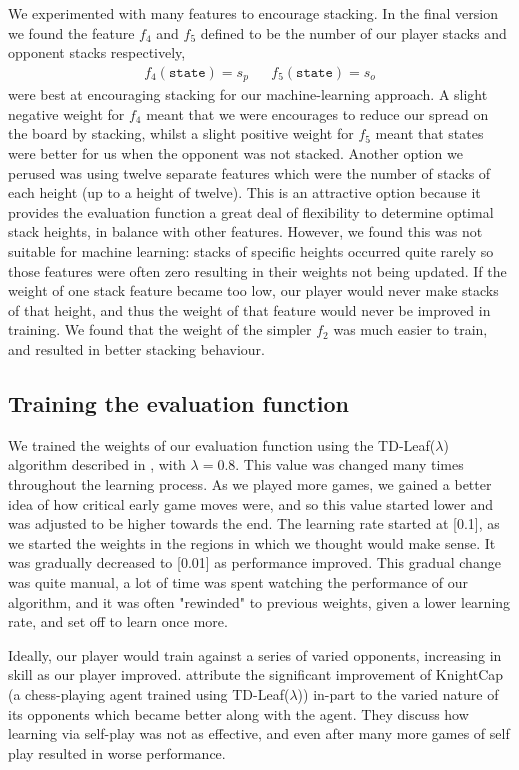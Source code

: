 \documentclass[11pt]{article}
\newcommand{\drafting}[1]{\textcolor{OliveGreen}{#1}}
\begin{document}
We experimented with many features to encourage stacking. In the final version we found the feature $f_4$ and $f_5$ defined to be the number of our player stacks and opponent stacks respectively,
\begin{align*}
    f_4(\texttt{state}) = s_p && f_5(\texttt{state}) = s_o
\end{align*}
were best at encouraging stacking for our machine-learning approach. A slight negative weight for $f_4$ meant that we were encourages to reduce our spread on the board by stacking, whilst a slight positive weight for $f_5$ meant that states were better for us when the opponent was not stacked. Another option we perused was using twelve separate features which were the number of stacks of each height (up to a height of twelve). This is an attractive option because it provides the evaluation function a great deal of flexibility to determine optimal stack heights, in balance with other features. However, we found this was not suitable for machine learning: stacks of specific heights occurred quite rarely so those features were often zero resulting in their weights not being updated. If the weight of one stack feature became too low, our player would never make stacks of that height, and thus the weight of that feature would never be improved in training. We found that the weight of the simpler $f_2$ was much easier to train, and resulted in better stacking behaviour.

\subsection{Training the evaluation function}
We trained the weights of our evaluation function using the TD-Leaf($\lambda$) algorithm described in \cite{baxter_tdleaflambda_1999}, with $\lambda = $\drafting{0.8. This value was changed many times throughout the learning process. As we played more games, we gained a better idea of how critical early game moves were, and so this value started lower and was adjusted to be higher towards the end}. The learning rate started at [\drafting{0.1}], as we started the weights in the regions in which we thought would make sense. It was gradually decreased to [\drafting{0.01}] as performance improved. This gradual change was quite manual, a lot of time was spent watching the performance of our algorithm, and it was often "rewinded" to previous weights, given a lower learning rate, and set off to learn once more.

Ideally, our player would train against a series of varied opponents, increasing in skill as our player improved. \cite{baxter_tdleaflambda_1999} attribute the significant improvement of KnightCap (a chess-playing agent trained using TD-Leaf($\lambda$)) in-part to the varied nature of its opponents which became better along with the agent. They discuss how learning via self-play was not as effective, and even after many more games of self play resulted in worse performance. 
\end{document}
